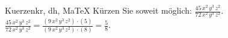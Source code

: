\begin{MAufgabe}{Kuerzen}{kr, dh, MaTeX}
K\"urzen Sie soweit m\"oglich: $\frac{45\, x^2\, y^3\, z^2}{72\, x^2\, y^3\, z^2}$.\\ 
\ifLsg\MLoesung
\quad $\frac{45\, x^2\, y^3\, z^2}{72\, x^2\, y^3\, z^2}=\frac{(9\, x^2\, y^3\, z^2)\cdot(5)}{(9\, x^2\, y^3\, z^2)\cdot(8)}=\frac{5}{8}$.\else\relax\fi
 \end{MAufgabe}